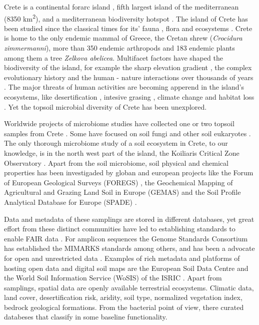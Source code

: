 Crete is a continental forarc island \parencite{ali2016}, fifth largest island of the mediterranean (8350 km\textsuperscript{2}),
and a mediterranean biodiversity hotspot \parencite{myers2000biodiversity}.
The island of Crete has been studied since the classical times for its'
fauna \parencite{Sidiropoulos_Polymeni_Legakis_2017,Anastasiou2018Tenebrionid}, flora \parencite{Krimbas_2005} and ecosystems \parencite{Grove1993}.
Crete is home to the only endemic mammal of Greece, the Cretan shrew (\textit{Crocidura zimmermanni}),
more than 350 endemic arthropods \parencite{bolanakis2024} and 183 endemic plants \parencite{Kougioumoutzis2020}
among them a tree \textit{Zelkova abelicea}. Multifacet factors have shaped the
biodiversity of the island, for example the sharp elevation gradient \parencite{trigas2013elevational, FAZAN2017},
the complex evolutionary history \parencite{POULAKAKIS2002} and the human - nature
interactions over thousands of years \parencite{Vogiatzakis2008_med, Sfenthourakis2017}.
The major threats of human activities are becoming apperend in the island's ecosystems,
like desertification \parencite{KARAMESOUTI2018266}, intesive grasing \parencite{JouffroyBapicot2016},
climate change \parencite{Kougioumoutzis2020,Vogiatzakis2016} and habitat loss \parencite{ISPIKOUDIS1993259}.
Yet the topsoil microbial diversity of Crete has been unexplored.

Worldwide projects of microbiome studies have collected one or two topsoil
samples from Crete \parencite{Vasar2022, Labouyrie2023, Bahram2018, Orgiazzi2018}.
Some have focused on soil fungi \parencite{Mikryukov2023, Davison2021, Tedersoo2021}
and other soil eukaryotes \parencite{Aslani2022}.
The only thorough microbiome study of a soil ecosystem in Crete, to our knowledge,
is in the north west part of the island, the Koiliaris Critical Zone Observatory \parencite{tsiknia2014}.
Apart from the soil microbiome, soil physical and chemical properties has been
investigaded by globan and european projects like the Forum of European Geological Surveys
(FOREGS) \parencite{nerc19017}, the Geochemical Mapping of Agricultural and Grazing Land
Soil in Europe (GEMAS) \parencite{REIMANN2018302} and the Soil Profile Analytical
Database for Europe (SPADE) \parencite{Hiederer2006}.

Data and metadata of these samplings are stored in different databases, yet 
great effort from these distinct communities have led to establishing standards
to enable FAIR data \parencite{wilkinson2016the-fair}. For amplicon sequences the Genome Standards
Consortium \parencite{Field2011} has established the MIMARKS \parencite{yilmaz2011minimum}
standards among others, and has been a advocate for open and unrestricted data \parencite{Amann2019}.
Examples of rich metadata and platforms of hosting open data and digital soil maps are the 
European Soil Data Centre \parencite{Panagos2022} and the World Soil Information
Service (WoSIS) of the ISRIC \parencite{Batjes2024}. Apart from samplings,
spatial data are openly available terrestrial ecosystems.
Climatic data, land cover, desertification risk, aridity, soil type, normalized
vegetation index, bedrock geological formations. From the bacterial point of view, 
there curated databeses that classify in some baseline functionality. 

